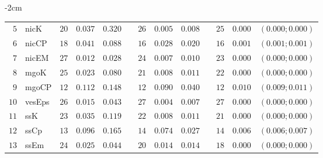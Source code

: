 \begin{table*}[!htbp]
\begin{adjustwidth*}{}{-2cm}
\begin{tabular}{@{}rlrrrrrrrrrcc@{}}
\footnotesize{$5 $} & \footnotesize{nicK     } & \footnotesize{$20$} & \footnotesize{$0.037$} & \footnotesize{$0.320$} && \footnotesize{$26$} & \footnotesize{$0.005$} & \footnotesize{$0.008$} && \footnotesize{$25$} & \footnotesize{$0.000$} & \footnotesize{$(0.000;0.000)$} \\
\footnotesize{$6 $} & \footnotesize{nicCP    } & \footnotesize{$18$} & \footnotesize{$0.041$} & \footnotesize{$0.088$} && \footnotesize{$16$} & \footnotesize{$0.028$} & \footnotesize{$0.020$} && \footnotesize{$16$} & \footnotesize{$0.001$} & \footnotesize{$(0.001;0.001)$} \\
\footnotesize{$7 $} & \footnotesize{nicEM    } & \footnotesize{$27$} & \footnotesize{$0.012$} & \footnotesize{$0.028$} && \footnotesize{$24$} & \footnotesize{$0.007$} & \footnotesize{$0.010$} && \footnotesize{$23$} & \footnotesize{$0.000$} & \footnotesize{$(0.000;0.000)$} \\
\footnotesize{$8 $} & \footnotesize{mgoK     } & \footnotesize{$25$} & \footnotesize{$0.023$} & \footnotesize{$0.080$} && \footnotesize{$21$} & \footnotesize{$0.008$} & \footnotesize{$0.011$} && \footnotesize{$22$} & \footnotesize{$0.000$} & \footnotesize{$(0.000;0.000)$} \\
\footnotesize{$9 $} & \footnotesize{mgoCP    } & \footnotesize{$12$} & \footnotesize{$0.112$} & \footnotesize{$0.148$} && \footnotesize{$12$} & \footnotesize{$0.090$} & \footnotesize{$0.040$} && \footnotesize{$12$} & \footnotesize{$0.010$} & \footnotesize{$(0.009;0.011)$} \\
\footnotesize{$10$} & \footnotesize{vesEps   } & \footnotesize{$26$} & \footnotesize{$0.015$} & \footnotesize{$0.043$} && \footnotesize{$27$} & \footnotesize{$0.004$} & \footnotesize{$0.007$} && \footnotesize{$27$} & \footnotesize{$0.000$} & \footnotesize{$(0.000;0.000)$} \\
\footnotesize{$11$} & \footnotesize{ssK      } & \footnotesize{$23$} & \footnotesize{$0.035$} & \footnotesize{$0.119$} && \footnotesize{$22$} & \footnotesize{$0.008$} & \footnotesize{$0.011$} && \footnotesize{$21$} & \footnotesize{$0.000$} & \footnotesize{$(0.000;0.000)$} \\
\footnotesize{$12$} & \footnotesize{ssCp     } & \footnotesize{$13$} & \footnotesize{$0.096$} & \footnotesize{$0.165$} && \footnotesize{$14$} & \footnotesize{$0.074$} & \footnotesize{$0.027$} && \footnotesize{$14$} & \footnotesize{$0.006$} & \footnotesize{$(0.006;0.007)$} \\
\footnotesize{$13$} & \footnotesize{ssEm     } & \footnotesize{$24$} & \footnotesize{$0.025$} & \footnotesize{$0.044$} && \footnotesize{$20$} & \footnotesize{$0.014$} & \footnotesize{$0.014$} && \footnotesize{$18$} & \footnotesize{$0.000$} & \footnotesize{$(0.000;0.000)$} \\

\end{tabular}
\end{adjustwidth*}
\end{table*}
